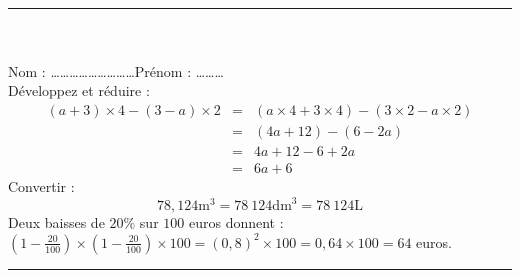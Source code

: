 \documentclass[14 pt, fleqn]{extarticle}
\theoremstyle{plain}
\begin{document}
 \ \\ 
 \hrule
 \ \\ \ \\
 Nom : \ldots\ldots\ldots\ldots\ldots\ldots\ldots\ldots\ldots Prénom : \ldots\ldots\ldots \\ 
Développez et réduire :
 \begin{eqnarray*}
(a+3)\times 4 - (3 - a) \times 2
&=& ( a \times 4 + 3 \times 4) - (3\times 2 - a \times 2)\\
&=& (4a +12) - (6-2a) \\
&=& 4a + 12 - 6 + 2a \\
&=& 6a +6 \end{eqnarray*} 
 Convertir : 
 \[ 78,124 \text{m}^3 = 78\ 124 \text{dm}^3=  78\ 124 \text{L}\]
Deux baisses de $20 \%$ sur $100$ euros donnent : 
$(1-\frac{20}{100}) \times (1-\frac{20}{100}) \times 100 = (0,8)^2 \times 100 = 0,64 \times 100 = 64$ euros.
 \ \\  
 \hrule
 
 
 
 	
\end{document}
